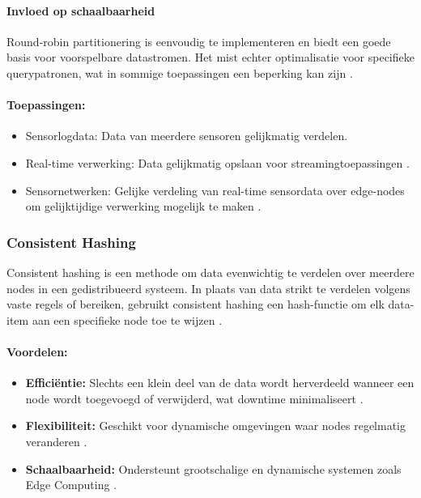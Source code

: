 \paragraph{Invloed op schaalbaarheid} 
Round-robin partitionering is eenvoudig te implementeren en biedt een goede basis voor voorspelbare datastromen. Het mist echter optimalisatie voor specifieke querypatronen, wat in sommige toepassingen een beperking kan zijn \autocite{Ponnusamy2024}.
 
\paragraph{Toepassingen:}
\begin{itemize}
    \item Sensorlogdata: Data van meerdere sensoren gelijkmatig verdelen.
    \item Real-time verwerking: Data gelijkmatig opslaan voor streamingtoepassingen \autocite{Mahmud2020}.
    \item Sensornetwerken: Gelijke verdeling van real-time sensordata over edge-nodes om gelijktijdige verwerking mogelijk te maken \autocite{Mahmud2020}.
\end{itemize}

\subsubsection{Consistent Hashing}
Consistent hashing is een methode om data evenwichtig te verdelen over meerdere nodes in een gedistribueerd systeem. In plaats van data strikt te verdelen volgens vaste regels of bereiken, gebruikt consistent hashing een hash-functie om elk data-item aan een specifieke node toe te wijzen \autocite{Kleppmann2017}.

\paragraph{Voordelen:}
\begin{itemize}
    \item \textbf{Efficiëntie:} Slechts een klein deel van de data wordt herverdeeld wanneer een node wordt toegevoegd of verwijderd, wat downtime minimaliseert \autocite{Kleppmann2017}.
    \item \textbf{Flexibiliteit:} Geschikt voor dynamische omgevingen waar nodes regelmatig veranderen \autocite{Kleppmann2017}.
    \item \textbf{Schaalbaarheid:} Ondersteunt grootschalige en dynamische systemen zoals Edge Computing \autocite{Kleppmann2017}.
\end{itemize}

